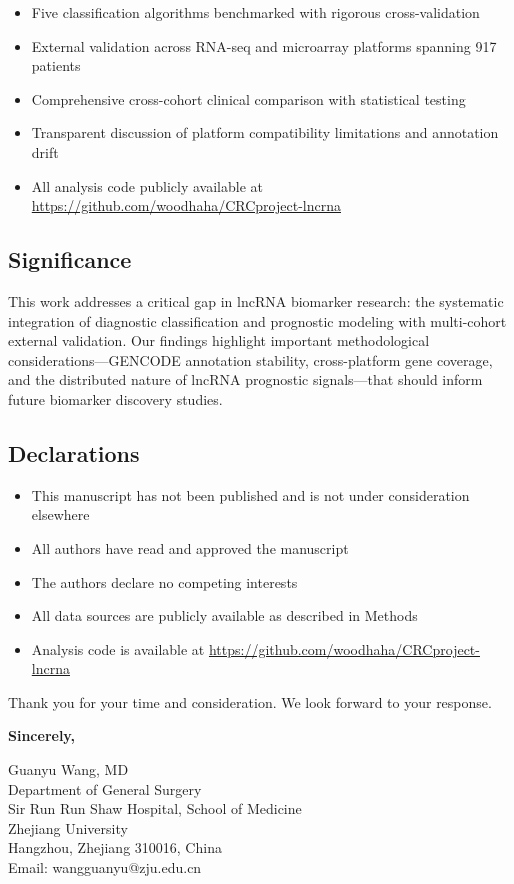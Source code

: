 \documentclass[fleqn,10pt]{wlscirep}
\begin{document}
\begin{itemize}
    \item Five classification algorithms benchmarked with rigorous cross-validation
    \item External validation across RNA-seq and microarray platforms spanning 917 patients
    \item Comprehensive cross-cohort clinical comparison with statistical testing
    \item Transparent discussion of platform compatibility limitations and annotation drift
    \item All analysis code publicly available at \url{https://github.com/woodhaha/CRCproject-lncrna}
\end{itemize}

\subsection*{Significance}

This work addresses a critical gap in lncRNA biomarker research: the systematic integration of diagnostic classification and prognostic modeling with multi-cohort external validation. Our findings highlight important methodological considerations—GENCODE annotation stability, cross-platform gene coverage, and the distributed nature of lncRNA prognostic signals—that should inform future biomarker discovery studies.

\subsection*{Declarations}

\begin{itemize}
    \item This manuscript has not been published and is not under consideration elsewhere
    \item All authors have read and approved the manuscript
    \item The authors declare no competing interests
    \item All data sources are publicly available as described in Methods
    \item Analysis code is available at \url{https://github.com/woodhaha/CRCproject-lncrna}
\end{itemize}

\vspace{0.5cm}

Thank you for your time and consideration. We look forward to your response.

\vspace{0.5cm}

\textbf{Sincerely,}

\vspace{0.3cm}

Guanyu Wang, MD \\
Department of General Surgery \\
Sir Run Run Shaw Hospital, School of Medicine \\
Zhejiang University \\
Hangzhou, Zhejiang 310016, China \\
Email: wangguanyu@zju.edu.cn
\end{document}
